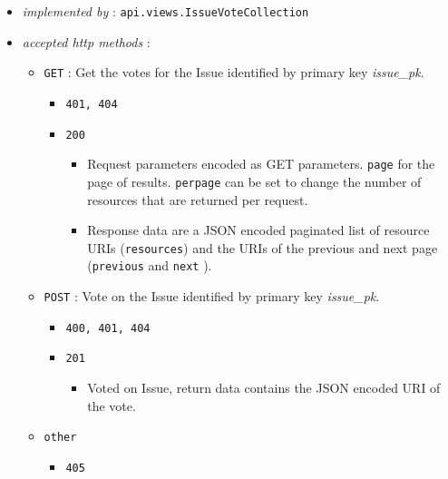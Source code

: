 \documentclass[a4paper]{report}
\begin{document}
\begin{itemize}
    \item{\textsl{implemented by} : \texttt{api.views.IssueVoteCollection}}
    \item{\textsl{accepted http methods} :
        \begin{itemize}
            \item{\texttt{GET} : Get the votes for the Issue identified by primary key \emph{issue\_pk}.
                \begin{itemize}
                    \item{\texttt{401, 404}}
                    \item{\texttt{200}
                    \begin{itemize}
                        \item{Request parameters encoded as GET parameters. 
                        \texttt{page} for the page of results.
                        \texttt{perpage} can be set to change the number of 
                        resources that are returned per request.                        
                        }
                        \item{Response data are a JSON encoded paginated list of 
                        resource URIs (\texttt{resources}) and the URIs of the 
                        previous and next page (\texttt{previous} and \texttt{next}
                        ).}
                    \end{itemize}
                    }
                \end{itemize}
            }
            \item{\texttt{POST} : Vote on the Issue identified by primary key \emph{issue\_pk}.
                \begin{itemize}
                    \item{\texttt{400, 401, 404}}
                    \item{\texttt{201}
                        \begin{itemize}
                            \item{Voted on Issue, return data contains the JSON 
                            encoded URI of the vote.}
                        \end{itemize}
                    }
                \end{itemize}
            }
            \item{\texttt{other}
                \begin{itemize}
                    \item{\texttt{405}}
                \end{itemize}
            }
        \end{itemize}
    }
\end{itemize}
\end{document}
